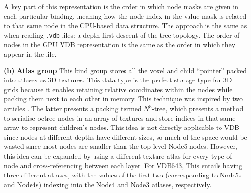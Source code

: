     A key part of this representation is the order in which node masks are given in each particular binding, meaning how the node index in the value mask is related to that same node in the CPU-based data structure. The approach is the same as when reading \texttt{.vdb} files: a depth-first descent of the tree topology. The order of nodes in the GPU VDB representation is the same as the order in which they appear in the file.


\textbf{(b) Atlas group} This bind group stores all the voxel and child ``pointer'' packed into atlases as 3D textures. This data type is the perfect storage type for 3D grids because it enables retaining relative coordinates within the nodes while packing them next to each other in memory. This technique was inspired by two articles \cite{octree:1,octree:2}. The latter presents a packing termed $N^{3}$-tree, which presents a method to serialise octree nodes in an array of textures and store indices in that same array to represent children's nodes. This idea is not directly applicable to VDB since nodes at different depths have different sizes, so much of the space would be wasted since most nodes are smaller than the top-level Node5 nodes. However, this idea can be expanded by using a different texture atlas for every type of node and cross-referencing between each layer. For VDB543, This entails having three different atlases, with the values of the first two (corresponding to Node5s and Node4s) indexing into the Node4 and Node3 atlases, respectively.

